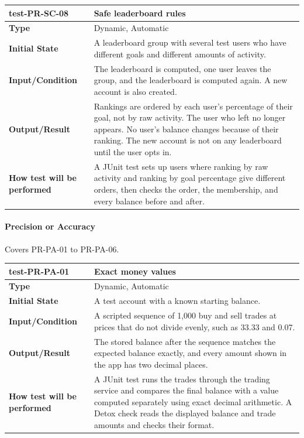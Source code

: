 \documentclass[12pt, titlepage]{article}
\begin{document}
\vspace{1em}

\noindent\begin{tabularx}{\textwidth}{>{\raggedright\arraybackslash}p{3.5cm}X}
  \toprule
  \textbf{test-PR-SC-08} & \textbf{Safe leaderboard rules}\\
  \midrule
  \textbf{Type} & Dynamic, Automatic\\
  \textbf{Initial State} & A leaderboard group with several test users who have different goals and different amounts of activity.\\
  \textbf{Input/Condition} & The leaderboard is computed, one user leaves the group, and the leaderboard is computed again. A new account is also created.\\
  \textbf{Output/Result} & Rankings are ordered by each user's percentage of their goal, not by raw activity. The user who left no longer appears. No user's balance changes because of their ranking. The new account is not on any leaderboard until the user opts in.\\
  \textbf{How test will be performed} & A JUnit test sets up users where ranking by raw activity and ranking by goal percentage give different orders, then checks the order, the membership, and every balance before and after.\\
  \bottomrule
\end{tabularx}

\paragraph{Precision or Accuracy}

Covers PR-PA-01 to PR-PA-06.

\noindent\begin{tabularx}{\textwidth}{>{\raggedright\arraybackslash}p{3.5cm}X}
  \toprule
  \textbf{test-PR-PA-01} & \textbf{Exact money values}\\
  \midrule
  \textbf{Type} & Dynamic, Automatic\\
  \textbf{Initial State} & A test account with a known starting balance.\\
  \textbf{Input/Condition} & A scripted sequence of 1,000 buy and sell trades at prices that do not divide evenly, such as 33.33 and 0.07.\\
  \textbf{Output/Result} & The stored balance after the sequence matches the expected balance exactly, and every amount shown in the app has two decimal places.\\
  \textbf{How test will be performed} & A JUnit test runs the trades through the trading service and compares the final balance with a value computed separately using exact decimal arithmetic. A Detox check reads the displayed balance and trade amounts and checks their format.\\
  \bottomrule
\end{tabularx}
\end{document}
